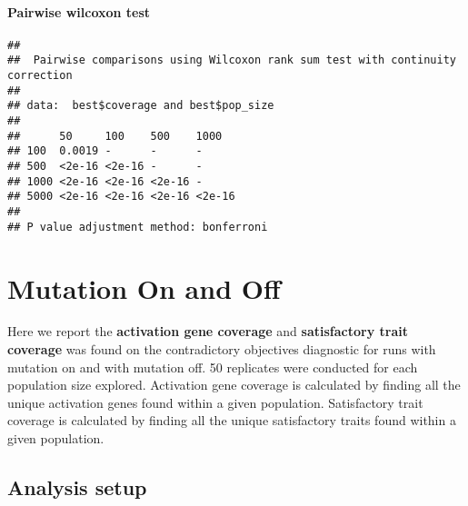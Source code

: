 \documentclass[
]{book}
\newenvironment{Shaded}{\begin{snugshade}}{\end{snugshade}}
\newcommand{\AttributeTok}[1]{\textcolor[rgb]{0.13,0.29,0.53}{#1}}
\newcommand{\ConstantTok}[1]{\textcolor[rgb]{0.56,0.35,0.01}{#1}}
\newcommand{\FunctionTok}[1]{\textcolor[rgb]{0.13,0.29,0.53}{\textbf{#1}}}
\newcommand{\NormalTok}[1]{#1}
\newcommand{\SpecialCharTok}[1]{\textcolor[rgb]{0.81,0.36,0.00}{\textbf{#1}}}
\newcommand{\StringTok}[1]{\textcolor[rgb]{0.31,0.60,0.02}{#1}}
\begin{document}
\hypertarget{pairwise-wilcoxon-test-2}{%
\subsubsection{Pairwise wilcoxon test}\label{pairwise-wilcoxon-test-2}}

\begin{Shaded}
\end{Shaded}

\begin{verbatim}
## 
##  Pairwise comparisons using Wilcoxon rank sum test with continuity correction 
## 
## data:  best$coverage and best$pop_size 
## 
##      50     100    500    1000  
## 100  0.0019 -      -      -     
## 500  <2e-16 <2e-16 -      -     
## 1000 <2e-16 <2e-16 <2e-16 -     
## 5000 <2e-16 <2e-16 <2e-16 <2e-16
## 
## P value adjustment method: bonferroni
\end{verbatim}

\hypertarget{mutation-on-and-off}{%
\chapter{Mutation On and Off}\label{mutation-on-and-off}}

Here we report the \textbf{activation gene coverage} and \textbf{satisfactory trait coverage} was found on the contradictory objectives diagnostic for runs with mutation on and with mutation off.
50 replicates were conducted for each population size explored.
Activation gene coverage is calculated by finding all the unique activation genes found within a given population.
Satisfactory trait coverage is calculated by finding all the unique satisfactory traits found within a given population.

\hypertarget{analysis-setup-2}{%
\section{Analysis setup}\label{analysis-setup-2}}
\end{document}
